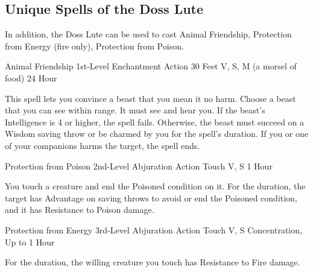 \subsection*{Unique Spells of the Doss Lute}
In addition, the Doss Lute can be used to cast Animal Friendship, Protection from Energy (fire only), Protection from Poison.

\DndSpellHeader
  {Animal Friendship}
  {1st-Level Enchantment}
  {Action}
  {30 Feet}
  {V, S, M (a morsel of food)}
  {24 Hour}

This spell lets you convince a beast that you mean it no harm. Choose a beast that you can see within range. It must see and hear you. If the beast's Intelligence is 4 or higher, the spell fails. Otherwise, the beast must succeed on a Wisdom saving throw or be charmed by you for the spell's duration. If you or one of your companions harms the target, the spell ends.

\DndSpellHeader
  {Protection from Poison}
  {2nd-Level Abjuration}
  {Action}
  {Touch}
  {V, S}
  {1 Hour}

You touch a creature and end the Poisoned condition on it. For the duration, the target has Advantage on saving throws to avoid or end the Poisoned condition, and it has Resistance to Poison damage.

\DndSpellHeader
  {Protection from Energy}
  {3rd-Level Abjuration}
  {Action}
  {Touch}
  {V, S}
  {Concentration, Up to 1 Hour}

For the duration, the willing creature you touch has Resistance to Fire damage.